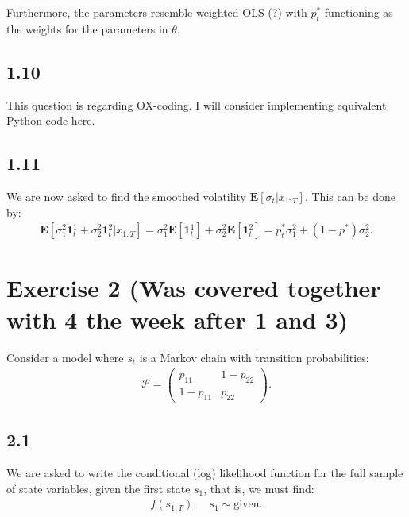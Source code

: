 \documentclass[11pt,a4paper,oneside]{article}
\newcommand{\lp}{\left(}
\newcommand{\rp}{\right)}
\newcommand{\rb}{\right]}
\newcommand{\lb}{\left[}
\newcommand{\ee}{\mathbf{E}}
\newcommand{\pp}{\mathcal{P}}
\newcommand{\ii}{\mathbf{1}}
\begin{document}
Furthermore, the parameters resemble weighted OLS (?) with $p_t^*$ functioning as the weights for the parameters in $\theta$.

\subsection{1.10}
This question is regarding OX-coding. I will consider implementing equivalent Python code here.

\subsection{1.11}
We are now asked to find the smoothed volatility $\ee\lb \sigma_t \vert x_{1:T}\rb $. This can be done by:
\begin{align}
    \ee\lb \sigma_1^2 \ii_t^1 + \sigma_2^2 \ii_t^2 \vert x_{1:T}\rb = \sigma_1^2 \ee\lb \ii_t^1 \rb + \sigma_2^2 \ee\lb \ii_t^2\rb = p_t^* \sigma_1^2 + \lp 1 - p^*\rp \sigma_2^2.
\end{align}





\clearpage






\section{Exercise 2 (Was covered together with 4 the week after 1 and 3)}
\renewcommand{\theequation}{2.\arabic{equation}}
\setcounter{equation}{0}

Consider a model where $s_t$ is a Markov chain with transition probabilities:
\begin{align}
    \pp =
        \begin{pmatrix}
            p_11 & 1 - p_22\\
            1 - p_11 & p_22
        \end{pmatrix}.
\end{align}

\subsection{2.1}
We are asked to write the conditional (log) likelihood function for the full sample of state variables, given the first state $s_1$, that is, we must find:
\begin{align}
    f\lp s_{1:T} \rp, \quad s_1 \sim \text{given}.
\end{align}
\end{document}

